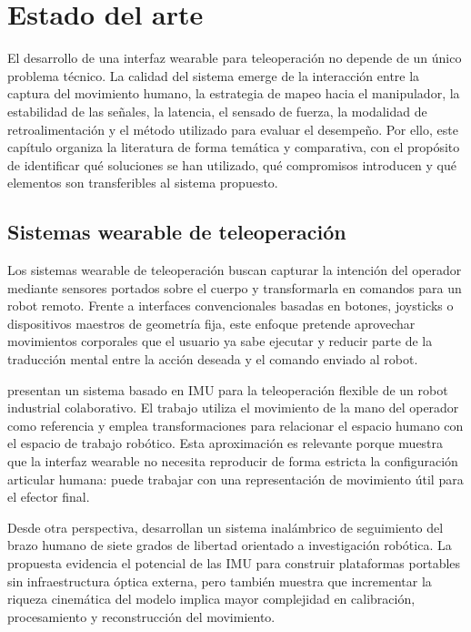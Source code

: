 \chapter{Estado del arte}
\label{chap:estado-arte}

El desarrollo de una interfaz wearable para teleoperación no depende de un único problema técnico. La calidad del sistema emerge de la interacción entre la captura del movimiento humano, la estrategia de mapeo hacia el manipulador, la estabilidad de las señales, la latencia, el sensado de fuerza, la modalidad de retroalimentación y el método utilizado para evaluar el desempeño. Por ello, este capítulo organiza la literatura de forma temática y comparativa, con el propósito de identificar qué soluciones se han utilizado, qué compromisos introducen y qué elementos son transferibles al sistema propuesto.

\section{Sistemas wearable de teleoperación}

Los sistemas wearable de teleoperación buscan capturar la intención del operador mediante sensores portados sobre el cuerpo y transformarla en comandos para un robot remoto. Frente a interfaces convencionales basadas en botones, joysticks o dispositivos maestros de geometría fija, este enfoque pretende aprovechar movimientos corporales que el usuario ya sabe ejecutar y reducir parte de la traducción mental entre la acción deseada y el comando enviado al robot.

\textcite{skulj2021wearable} presentan un sistema basado en IMU para la teleoperación flexible de un robot industrial colaborativo. El trabajo utiliza el movimiento de la mano del operador como referencia y emplea transformaciones para relacionar el espacio humano con el espacio de trabajo robótico. Esta aproximación es relevante porque muestra que la interfaz wearable no necesita reproducir de forma estricta la configuración articular humana: puede trabajar con una representación de movimiento útil para el efector final.

Desde otra perspectiva, \textcite{shintemirov2020opensource} desarrollan un sistema inalámbrico de seguimiento del brazo humano de siete grados de libertad orientado a investigación robótica. La propuesta evidencia el potencial de las IMU para construir plataformas portables sin infraestructura óptica externa, pero también muestra que incrementar la riqueza cinemática del modelo implica mayor complejidad en calibración, procesamiento y reconstrucción del movimiento.

